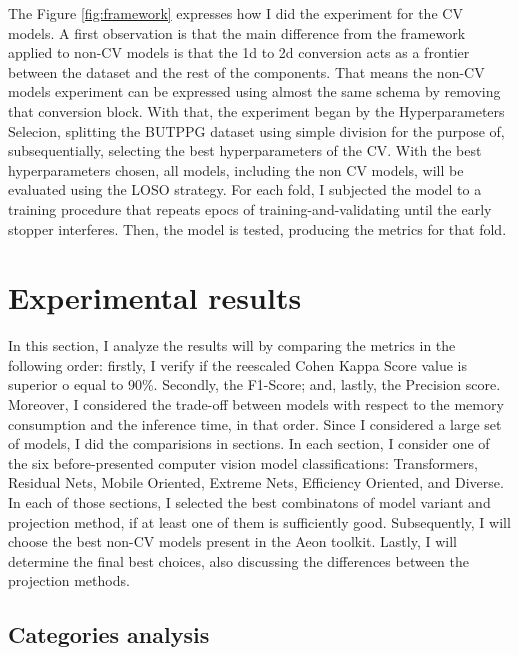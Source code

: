

The Figure \ref{fig:framework} expresses how I did the experiment for the \acrshort{CV} models. A first observation is that the main difference from the framework applied to non-\acrshort{CV} models is that the 1d to 2d conversion acts as a frontier between the dataset and the rest of the components. That means the non-\acrshort{CV} models experiment can be expressed using almost the same schema by removing that conversion block. With that, the experiment began by the Hyperparameters Selecion, splitting the \acrshort{BUTPPG} dataset using simple division for the purpose of, subsequentially, selecting the best hyperparameters of the \acrshort{CV}. With the best hyperparameters chosen, all models, including the non \acrshort{CV} models, will be evaluated using the \acrshort{LOSO} strategy. For each fold, I subjected the model to a training procedure that repeats epocs of training-and-validating until the early stopper interferes. Then, the model is tested, producing the metrics for that fold.


\section{Experimental results}


In this section, I analyze the results will by comparing the metrics in the following order: firstly, I verify if the reescaled Cohen Kappa Score value is superior o equal to 90\%. Secondly, the F1-Score; and, lastly, the Precision score. Moreover, I considered the trade-off between models with respect to the memory consumption and the inference time, in that order. Since I considered a large set of models, I did the comparisions in sections. In each section, I consider one of the six before-presented computer vision model classifications: Transformers, Residual Nets, Mobile Oriented, Extreme Nets, Efficiency Oriented, and Diverse. In each of those sections, I selected the best combinatons of model variant and projection method, if at least one of them is sufficiently good. Subsequently, I will choose the best non-\acrshort{CV} models present in the Aeon toolkit. Lastly, I will determine the final best choices, also discussing the differences between the projection methods.

\subsection{Categories analysis}


